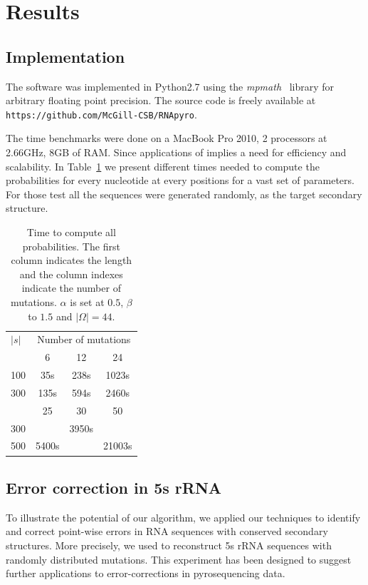\section{Results}
\label{sec:results}

\subsection{Implementation}
The software was implemented in Python2.7 using the \textit{mpmath}~\cite{mpmath} library
for  arbitrary floating point precision. The source code is freely available at \verb+https://github.com/McGill-CSB/RNApyro+.

The time benchmarks were done on a MacBook Pro 2010, 2 processors at 2.66GHz, 8GB of RAM.
Since applications of \RNApyro implies a need for
 efficiency and scalability. In Table~\ref{tab:time} we
present different times needed to compute the probabilities for  every nucleotide at every positions for a vast set of parameters. For those test
 all the sequences were generated randomly, as the target secondary structure.

\begin{table}
\begin{center}
\begin{tabular}{lccc}
$|s|$&\multicolumn{3}{c}{Number of mutations}\\\cline{2-4}
		 			  & 6   &  12  & 24\\\cline{2-4}
100  				& 35s  & 238s & 1023s\\
300  			& 135s & 594s &2460s\\\cline{2-4}
		 						& 25   & 30   &	50		\\\cline{2-4}
300       &      &  3950s&     \\
500         & 5400s&       &  21003s    \\
\end{tabular}
\end{center}
\caption{Time to compute all probabilities. The first column indicates the length and  the column indexes indicate the number
 of mutations. $\alpha$ is
set at $0.5$,  $\beta$ to $1.5$ and $|\Omega|=44$.}
\label{tab:time}
\end{table}


\subsection{Error correction in 5s rRNA}

To illustrate the potential of our algorithm, we applied our techniques to identify and correct point-wise errors in RNA sequences
with conserved secondary structures. More precisely, we used \RNApyro to reconstruct 5s rRNA sequences with randomly distributed
mutations. This experiment has been designed to suggest further applications to error-corrections in pyrosequencing data.

